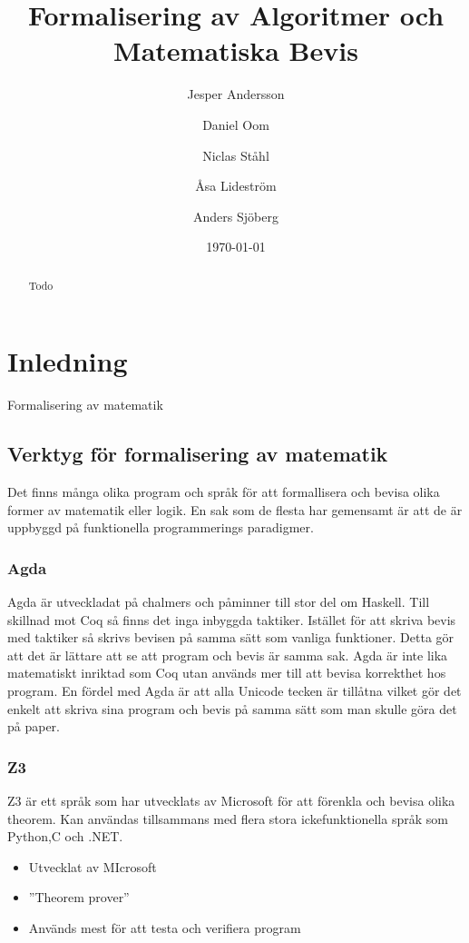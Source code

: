 \documentclass[a4paper]{article}
\title{Formalisering av Algoritmer och Matematiska Bevis}
\author[1]{Jesper Andersson}
\author[1]{Daniel Oom}
\author[1]{Niclas Ståhl}
\author[2]{Åsa Lideström}
\author[2]{Anders Sjöberg}
\affil[1]{Datateknik, Chalmers}
\affil[2]{Mattematik, Göteborgs Universitet}
\date{\today}
\begin{document}
\begin{abstract}
Todo
\end{abstract}
\maketitle
\thispagestyle{empty}
\newpage
\tableofcontents
\newpage
\section{Inledning}
Formalisering av matematik

\subsection{Verktyg för formalisering av matematik}
Det finns många olika program och språk för att formallisera och bevisa
olika former av matematik eller logik. En sak som de flesta har gemensamt är
att de är uppbyggd på funktionella programmerings paradigmer.

\subsubsection{Agda}
Agda är utveckladat på chalmers och påminner till stor del om Haskell. Till
skillnad mot Coq så finns det inga inbyggda taktiker. Istället för att skriva
bevis med taktiker så skrivs bevisen på samma sätt som vanliga funktioner.
Detta gör att det är lättare att se att program och bevis är samma sak. Agda är
inte lika matematiskt inriktad som Coq utan används mer till att bevisa
korrekthet hos program. En fördel med Agda är att alla Unicode tecken är
tillåtna vilket gör det enkelt att skriva sina program och bevis på samma sätt
som man skulle göra det på paper.

\subsubsection{Z3}
Z3 är ett språk som har utvecklats av Microsoft för att förenkla och bevisa
olika theorem. Kan användas tillsammans med flera stora ickefunktionella språk
som Python,C och .NET.

\begin{itemize}
  \item Utvecklat av MIcrosoft
  \item ''Theorem prover''
  \item Används mest för att testa och verifiera program
\end{itemize}
\end{document}

